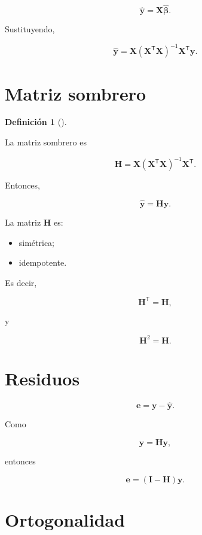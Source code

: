 \documentclass[
  spanish,
  11pt,
  letterpaper,
  DIV=11,
  numbers=noendperiod]{scrreprt}
\providecommand{\tightlist}{%
  \setlength{\itemsep}{0pt}\setlength{\parskip}{0pt}}
\theoremstyle{definition}
\newtheorem{definition}{Definición}[chapter]
\theoremstyle{plain}
\theoremstyle{definition}
\theoremstyle{remark}
\begin{document}
\[
\widehat{\mathbf{y}}
=
\mathbf{X}
\widehat{\boldsymbol{\beta}}.
\]

Sustituyendo,

\[
\widehat{\mathbf{y}}
=
\mathbf{X}
\left(
\mathbf{X}^{\mathsf T}\mathbf{X}
\right)^{-1}
\mathbf{X}^{\mathsf T}
\mathbf{y}.
\]

\section{Matriz sombrero}\label{matriz-sombrero-1}

\begin{definition}[]\protect\hypertarget{def-matriz-sombrero-multiple}{}\label{def-matriz-sombrero-multiple}

La matriz sombrero es

\[
\mathbf{H}
=
\mathbf{X}
\left(
\mathbf{X}^{\mathsf T}\mathbf{X}
\right)^{-1}
\mathbf{X}^{\mathsf T}.
\]

\end{definition}

Entonces,

\[
\widehat{\mathbf{y}}
=
\mathbf{H}\mathbf{y}.
\]

La matriz \(\mathbf{H}\) es:

\begin{itemize}
\tightlist
\item
  simétrica;
\item
  idempotente.
\end{itemize}

Es decir,

\[
\mathbf{H}^{\mathsf T}
=
\mathbf{H},
\]

y

\[
\mathbf{H}^2
=
\mathbf{H}.
\]

\section{Residuos}\label{residuos-1}

\[
\mathbf{e}
=
\mathbf{y}
-
\widehat{\mathbf{y}}.
\]

Como

\[
\widehat{\mathbf{y}}
=
\mathbf{H}\mathbf{y},
\]

entonces

\[
\mathbf{e}
=
(\mathbf{I}-\mathbf{H})\mathbf{y}.
\]

\section{Ortogonalidad}\label{ortogonalidad-1}
\end{document}
